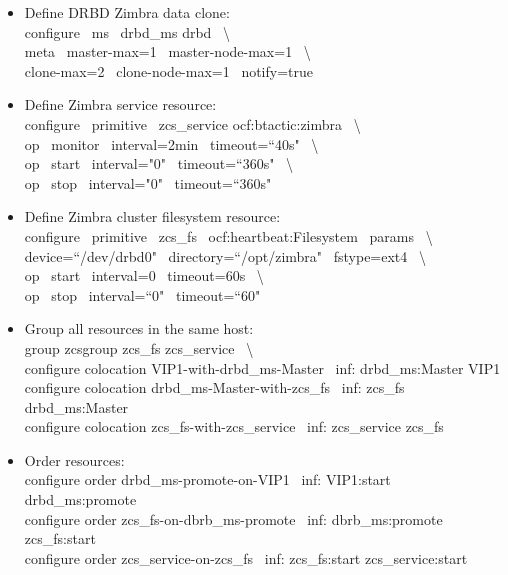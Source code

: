 \documentclass[a4paper, 12pt]{book}
\begin{document}
\begin{itemize}
	\item Define DRBD Zimbra data clone:\\
		configure \ ms \ drbd\_ms drbd \ \textbackslash \\
		meta \ master-max=1 \ master-node-max=1 \ \textbackslash \\
		clone-max=2 \ clone-node-max=1 \ notify=true
\end{itemize}

\begin{itemize}
	\item Define Zimbra service resource:\\
		configure \ primitive \ zcs\_service ocf:btactic:zimbra \ \textbackslash \\
		op \ monitor \ interval=2min \ timeout=``40s" \ \textbackslash \\
		op \ start \ interval="0" \ timeout=``360s" \ \textbackslash \\
		op \ stop \ interval="0" \ timeout=``360s"
\end{itemize}

\begin{itemize}
	\item Define Zimbra cluster filesystem resource:\\
		configure \ primitive \ zcs\_fs \ ocf:heartbeat:Filesystem \ params \ \textbackslash \\ 
		device=``/dev/drbd0" \ directory=``/opt/zimbra" \ fstype=ext4 \ \textbackslash \\
		op \ start \ interval=0 \ timeout=60s \ \textbackslash \\
		op \ stop \ interval=``0" \ timeout=``60"
\end{itemize}

\begin{itemize}
	\item Group all resources in the same host:\\
		group zcsgroup zcs\_fs zcs\_service \ \textbackslash \\
		configure colocation VIP1-with-drbd\_ms-Master \ inf: drbd\_ms:Master VIP1 \\
		configure colocation drbd\_ms-Master-with-zcs\_fs \ inf: zcs\_fs drbd\_ms:Master \\
		configure colocation zcs\_fs-with-zcs\_service \ inf: zcs\_service zcs\_fs
\end{itemize}

\begin{itemize}
	\item Order resources:\\
		configure order drbd\_ms-promote-on-VIP1 \ inf: VIP1:start drbd\_ms:promote\\
		configure order zcs\_fs-on-dbrb\_ms-promote \ inf: dbrb\_ms:promote zcs\_fs:start\\
		configure order zcs\_service-on-zcs\_fs \ inf: zcs\_fs:start zcs\_service:start
\end{itemize}
\end{document}
